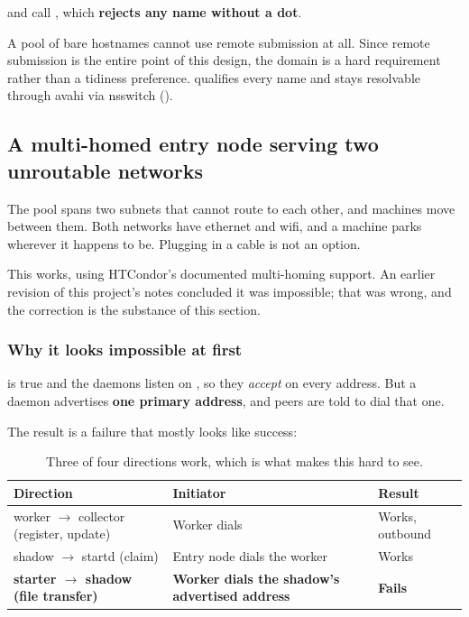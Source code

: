  and  call
, which \textbf{rejects any name without a dot}.

A pool of bare hostnames cannot use remote submission at all. Since remote
submission is the entire point of this design, the domain is a hard requirement
rather than a tidiness preference.
 qualifies every name and stays resolvable
through avahi via nsswitch ().

\subsection{A multi-homed entry node serving two unroutable networks}

The pool spans two subnets that cannot route to each other, and machines move
between them. Both networks have ethernet and wifi, and a machine parks
wherever it happens to be. Plugging in a cable is not an option.

This works, using HTCondor's documented multi-homing support. An earlier revision
of this project's notes concluded it was impossible; that was wrong, and the
correction is the substance of this section.

\subsubsection{Why it looks impossible at first}

 is true and the daemons listen on ,
so they \emph{accept} on every address. But a daemon advertises \textbf{one
primary address}, and peers are told to dial that one.

The result is a failure that mostly looks like success:

\begin{table}[H]
\centering
\begin{tabularx}{\textwidth}{L{0.30\textwidth} L{0.28\textwidth} Y}
\toprule
\textbf{Direction} & \textbf{Initiator} & \textbf{Result} \\
\midrule
worker $\rightarrow$ collector (register, update) & Worker dials  & Works, outbound \\
shadow $\rightarrow$ startd (claim) & Entry node dials the worker & Works \\
\textbf{starter $\rightarrow$ shadow (file transfer)} & \textbf{Worker dials the shadow's advertised address} & \textbf{Fails} \\
\bottomrule
\end{tabularx}
\caption{Three of four directions work, which is what makes this hard to see.}
\end{table}

